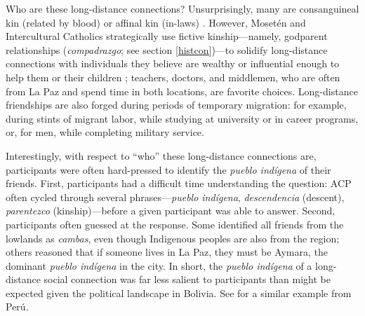 \documentclass[bibauthoryear]{aa}
\begin{document}
	Who are these long-distance connections? Unsurprisingly, many are consanguineal kin (related by blood) or affinal kin (in-laws) \citep{pisorjones2020}. %
	However, Moset\'en and Intercultural Catholics strategically use fictive kinship---namely, godparent relationships (\emph{compadrazgo}; see section \ref{histcon})---to solidify long-distance connections with individuals they believe are wealthy or influential enough to help them or their children \citep{mintz1950analysis}; teachers, doctors, and middlemen, who are often from La Paz and spend time in both locations, are favorite choices. Long-distance friendships are also forged during periods of temporary migration: for example, during stints of migrant labor, while studying at university or in career programs, or, for men, while completing  military service.
	
	Interestingly, with respect to ``who'' these long-distance connections are, participants were often hard-pressed to identify the \textit{pueblo ind\'igena} of their friends. First, participants had a difficult time understanding the question: ACP often cycled through several phrases---\textit{pueblo ind\'igena}, \textit{descendencia} (descent), \textit{parentezco} (kinship)---before a given participant was able to answer. Second, participants often guessed at the response. Some identified all friends from the lowlands as \textit{cambas}, even though Indigenous peoples are also from the region; others reasoned that if someone lives in La Paz, they must be Aymara, the dominant \textit{pueblo ind\'igena} in the city. In short, the \textit{pueblo ind\'igena} of a long-distance social connection was far less salient to participants than might be expected given the political landscape in Bolivia. See \citet{moya2015different} for a similar example from Per\'u.
\end{document}
